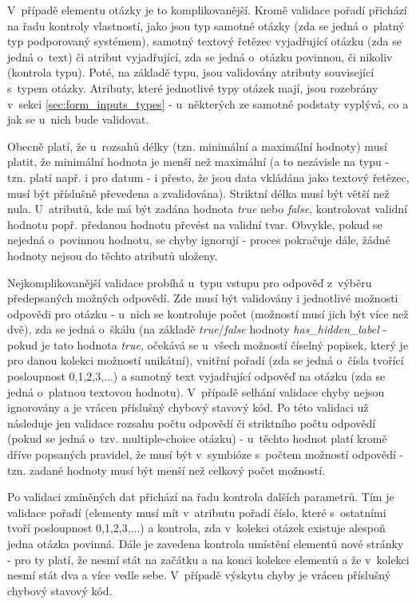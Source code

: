 			V~případě elementu otázky je to komplikovanější. Kromě validace pořadí přichází na řadu kontroly vlastností, jako jsou typ samotné otázky (zda se jedná o~platný typ podporovaný systémem), samotný textový řetězec vyjadřující otázku (zda se jedná o~text) či atribut vyjadřující, zda se jedná o~otázku povinnou, či nikoliv (kontrola typu). Poté, na základě typu, jsou validovány atributy související s~typem otázky. Atributy, které jednotlivé typy otázek mají, jsou rozebrány v~sekci \ref{sec:form_inputs_types} - u~některých ze samotné podstaty vyplývá, co a jak se u~nich bude validovat. 
			
			Obecně platí, že u~rozsahů délky (tzn. minimální a maximální hodnoty) musí platit, že minimální hodnota je menší než maximální (a to nezávisle na typu - tzn. platí např. i pro datum - i přesto, že jsou data vkládána jako textový řetězec, musí být příslušně převedena a zvalidována). Striktní délka musí být větší než nula. U~atributů, kde má být zadána hodnota \textit{true} nebo \textit{false}, kontrolovat validní hodnotu popř. předanou hodnotu převést na validní tvar. Obvykle, pokud se nejedná o~povinnou hodnotu, se chyby ignorují - proces pokračuje dále, žádné hodnoty nejsou do těchto atributů uloženy.
			
			Nejkomplikovanější validace probíhá u~typu vstupu pro odpověď z~výběru předepsaných možných odpovědí. Zde musí být validovány i jednotlivé možnosti odpovědi pro otázku - u~nich se kontroluje počet (možností musí jich být více než dvě), zda se jedná o~škálu (na základě \textit{true}/\textit{false} hodnoty \textit{has\_hidden\_label} - pokud je tato hodnota \textit{true}, očekává se u~všech možností číselný popisek, který je pro danou kolekci možností unikátní), vnitřní pořadí (zda se jedná o~čísla tvořící posloupnost 0,1,2,3,...) a samotný text vyjadřující odpověď na otázku (zda se jedná o~platnou textovou hodnotu). V~případě selhání validace chyby nejsou ignorovány a je vrácen příslušný chybový stavový kód. Po této validaci už následuje jen validace rozsahu počtu odpovědí či striktního počtu odpovědí (pokud se jedná o~tzv. multiple-choice otázku) - u~těchto hodnot platí kromě dříve popsaných pravidel, že musí být v~symbióze s~počtem možností odpovědí - tzn. zadané hodnoty musí být menší než celkový počet možností.
			
			Po validaci zmíněných dat přichází na řadu kontrola dalších parametrů. Tím je validace pořadí (elementy musí mít v~atributu pořadí číslo, které s~ostatními tvoří posloupnost 0,1,2,3,...) a kontrola, zda v~kolekci otázek existuje alespoň jedna otázka povinná. Dále je zavedena kontrola umístění elementů nové stránky - pro ty platí, že nesmí stát na začátku a na konci kolekce elementů a že v~kolekci nesmí stát dva a více vedle sebe. V~případě výskytu chyby je vrácen příslušný chybový stavový kód.
			
